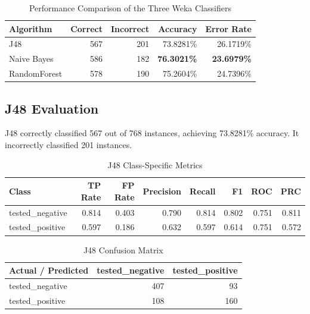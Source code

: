 \documentclass[11pt,a4paper]{article}
\begin{document}
\begin{table}[H]
\centering
\small
\caption{Performance Comparison of the Three Weka Classifiers}
\label{tab:comparison}
\begin{tabularx}{\textwidth}{lrrrr}
\toprule
\textbf{Algorithm} & \textbf{Correct} & \textbf{Incorrect} & \textbf{Accuracy} & \textbf{Error Rate} \\
\midrule
J48 & 567 & 201 & 73.8281\% & 26.1719\% \\
Naive Bayes & 586 & 182 & \textbf{76.3021\%} & \textbf{23.6979\%} \\
RandomForest & 578 & 190 & 75.2604\% & 24.7396\% \\
\bottomrule
\end{tabularx}
\end{table}

\subsection{J48 Evaluation}
J48 correctly classified 567 out of 768 instances, achieving 73.8281\% accuracy. It incorrectly classified 201 instances.

\begin{table}[H]
\centering
\small
\caption{J48 Class-Specific Metrics}
\label{tab:j48metrics}
\begin{tabular}{lrrrrrrr}
\toprule
\textbf{Class} & \textbf{TP Rate} & \textbf{FP Rate} & \textbf{Precision} & \textbf{Recall} & \textbf{F1} & \textbf{ROC} & \textbf{PRC} \\
\midrule
tested\_negative & 0.814 & 0.403 & 0.790 & 0.814 & 0.802 & 0.751 & 0.811 \\
tested\_positive & 0.597 & 0.186 & 0.632 & 0.597 & 0.614 & 0.751 & 0.572 \\
\bottomrule
\end{tabular}
\end{table}

\begin{table}[H]
\centering
\small
\caption{J48 Confusion Matrix}
\label{tab:j48cm}
\begin{tabular}{lrr}
\toprule
\textbf{Actual / Predicted} & \textbf{tested\_negative} & \textbf{tested\_positive} \\
\midrule
tested\_negative & 407 & 93 \\
tested\_positive & 108 & 160 \\
\bottomrule
\end{tabular}
\end{table}
\end{document}
